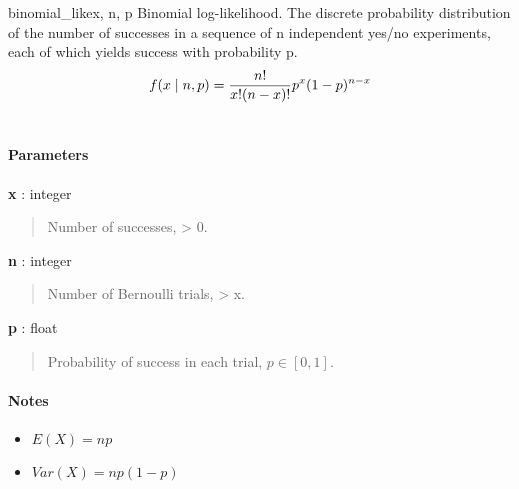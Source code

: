 \hypertarget{pymc.distributions.binomial_like}{}
\begin{funcdesc}{binomial\_like}{x, n, p}
Binomial log-likelihood.  The discrete probability distribution of the
number of successes in a sequence of n independent yes/no experiments,
each of which yields success with probability p.
\begin{gather}
\begin{split}f(x \mid n, p) = \frac{n!}{x!(n-x)!} p^x (1-p)^{n-x}\end{split}\notag\\\begin{split}\end{split}\notag
\end{gather}
\paragraph{Parameters}
\begin{paramlist}
\item[] \textbf{x} : integer
\begin{quote}

Number of successes, \textgreater{} 0.
\end{quote}

\item[]  \textbf{n} : integer
\begin{quote}

Number of Bernoulli trials, \textgreater{} x.
\end{quote}

\item[] \textbf{p} : float
\begin{quote}

Probability of success in each trial, $p \in [0,1]$.
\end{quote}
\end{paramlist}
\paragraph{Notes}
\begin{itemize}
\item {}
$E(X)=np$

\item {}
$Var(X)=np(1-p)$

\end{itemize}
\end{funcdesc}


